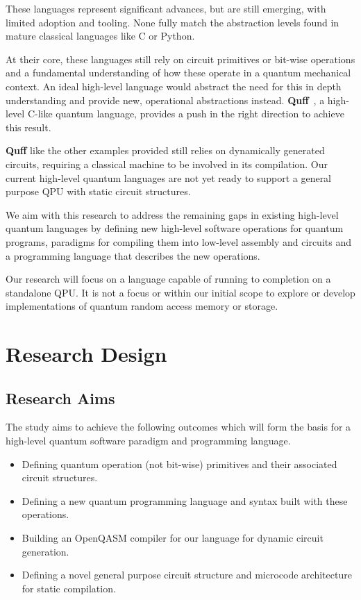 \documentclass[journal,onecolumn, compsoc]{IEEEtran}
\begin{document}
These languages represent significant advances, but are still emerging, with limited adoption and tooling. None fully match the abstraction levels found in mature classical languages like C or Python.

At their core, these languages still rely on circuit primitives or bit-wise operations and a fundamental understanding of how these operate in a quantum mechanical context.
An ideal high-level language would abstract the need for this in depth understanding and provide new, operational abstractions instead.
\textbf{Quff}~\cite{quff2024}, a high-level C-like quantum language, provides a push in the right direction to achieve this result. 

\textbf{Quff} like the other examples provided still relies on dynamically generated circuits, requiring a classical machine to be involved in its compilation.
Our current high-level quantum languages are not yet ready to support a general purpose QPU with static circuit structures.

We aim with this research to address the remaining gaps in existing high-level quantum languages by defining new high-level software operations for quantum programs, paradigms for compiling them into low-level assembly and circuits and a programming language that describes the new operations.

Our research will focus on a language capable of running to completion on a standalone QPU. 
It is not a focus or within our initial scope to explore or develop implementations of quantum random access memory or storage.

\section{Research Design}
\subsection{Research Aims}
The study aims to achieve the following outcomes which will form the basis for a high-level quantum software paradigm and programming language.
\begin{itemize}
    \item Defining quantum operation (not bit-wise) primitives and their associated circuit structures.
    \item Defining a new quantum programming language and syntax built with these operations.
    \item Building an OpenQASM compiler for our language for dynamic circuit generation.
    \item Defining a novel general purpose circuit structure and microcode architecture for static compilation.
\end{itemize}
\end{document}
